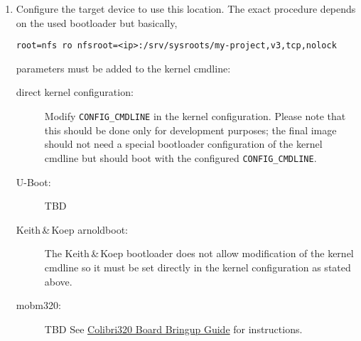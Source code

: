   \begin{enumerate}[resume]
  \item Configure the target device to use this location.  The exact
    procedure depends on the used bootloader but basically,
\begin{verbatim}
root=nfs ro nfsroot=<ip>:/srv/sysroots/my-project,v3,tcp,nolock
\end{verbatim}
    parameters must be added to the kernel cmdline:

    \begin{description}
    \item[direct kernel configuration:] Modify
      \texttt{CONFIG\_CMDLINE} in the kernel configuration.  Please
      note that this should be done only for development purposes; the
      final image should not need a special bootloader configuration
      of the kernel cmdline but should boot with the configured
      \texttt{CONFIG\_CMDLINE}.
    \item[U-Boot:] TBD
    \item[Keith\,\&\,Koep arnoldboot:] The Keith\,\&\,Koep bootloader
      does not allow modification of the kernel cmdline so it must be
      set directly in the kernel configuration as stated above.
    \item[mobm320:] TBD
      See \href{https://www.cvg.de/people/ensc/pxa320/BoardBringUp.html}{Colibri320 Board Bringup Guide} for instructions.
    \end{description}
  \end{enumerate}


